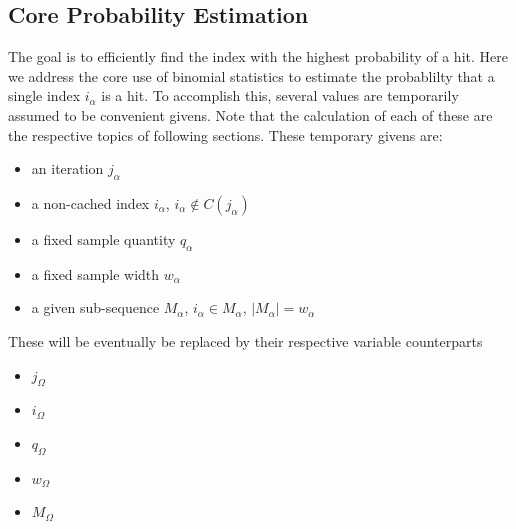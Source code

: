 \documentclass{article}
\newcommand{\br}{ \hfill \break}
\begin{document}
\begin{adjustwidth}{2.5em}{0pt}
    \subsection{Core Probability Estimation}
        The goal is to efficiently find the index with the highest probability of a hit.
        Here we address the core use of binomial statistics to estimate the probablilty that a single index $i_\alpha$ is a hit.\br
        \br
        To accomplish this, several values are temporarily assumed to be convenient givens.
        Note that the calculation of each of these are the respective topics of following sections.
        These temporary givens are:
        \begin{itemize}
            \item an iteration $j_\alpha$
            \item a non-cached index $i_\alpha$, $i_\alpha \notin C(j_\alpha)$
            \item a fixed sample quantity $q_\alpha$
            \item a fixed sample width $w_\alpha$
            \item a given sub-sequence $M_\alpha$, $i_\alpha \in M_\alpha$, $|M_\alpha| = w_\alpha$
        \end{itemize}
        These will be eventually be replaced by their respective variable counterparts
        \begin{itemize}
            \item $j_\Omega$
            \item $i_\Omega$
            \item $q_\Omega$
            \item $w_\Omega$
            \item $M_\Omega$
        \end{itemize}
        

\end{adjustwidth}
\end{document}
